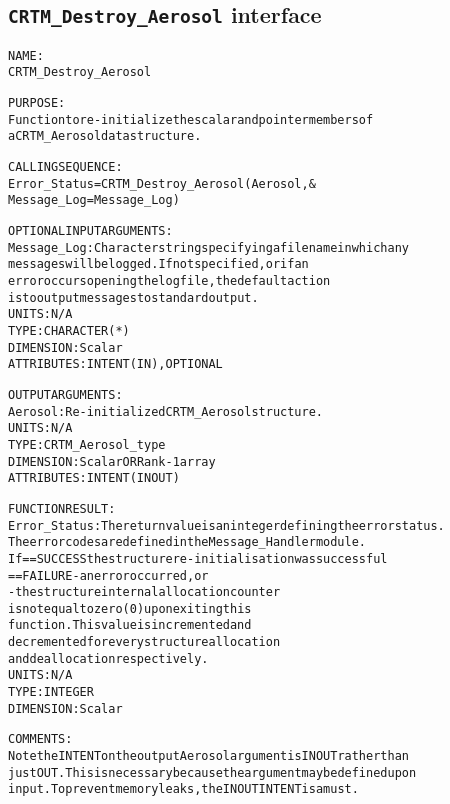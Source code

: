 \subsection{\texttt{CRTM\_Destroy\_Aerosol} interface}
  \label{sec:CRTM_Destroy_Aerosol_interface}
  \begin{alltt}
 
  NAME:
        CRTM_Destroy_Aerosol
  
  PURPOSE:
        Function to re-initialize the scalar and pointer members of
        a CRTM_Aerosol data structure.
 
  CALLING SEQUENCE:
        Error_Status = CRTM_Destroy_Aerosol( Aerosol                , &
                                             Message_Log=Message_Log  )
 
  OPTIONAL INPUT ARGUMENTS:
        Message_Log:  Character string specifying a filename in which any
                      messages will be logged. If not specified, or if an
                      error occurs opening the log file, the default action
                      is to output messages to standard output.
                      UNITS:      N/A
                      TYPE:       CHARACTER(*)
                      DIMENSION:  Scalar
                      ATTRIBUTES: INTENT(IN), OPTIONAL
 
  OUTPUT ARGUMENTS:
        Aerosol:      Re-initialized CRTM_Aerosol structure.
                      UNITS:      N/A
                      TYPE:       CRTM_Aerosol_type
                      DIMENSION:  Scalar OR Rank-1 array
                      ATTRIBUTES: INTENT(IN OUT)
 
  FUNCTION RESULT:
        Error_Status: The return value is an integer defining the error status.
                      The error codes are defined in the Message_Handler module.
                      If == SUCCESS the structure re-initialisation was successful
                         == FAILURE - an error occurred, or
                                    - the structure internal allocation counter
                                      is not equal to zero (0) upon exiting this
                                      function. This value is incremented and
                                      decremented for every structure allocation
                                      and deallocation respectively.
                      UNITS:      N/A
                      TYPE:       INTEGER
                      DIMENSION:  Scalar
 
  COMMENTS:
        Note the INTENT on the output Aerosol argument is IN OUT rather than
        just OUT. This is necessary because the argument may be defined upon
        input. To prevent memory leaks, the IN OUT INTENT is a must.
 
  \end{alltt}
